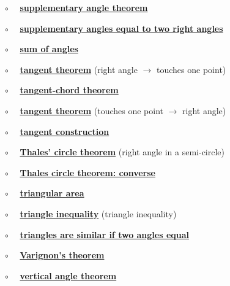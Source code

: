 \documentclass[11pt, oneside]{article}
\begin{document}
$\circ$ \ \ \hyperref[sec:supplementary_angle_theorem]{\textbf{supplementary angle theorem}}

$\circ$ \ \ \hyperref[sec:two_supplementary_equal_two_right]{\textbf{supplementary angles equal to two right angles}}

$\circ$ \ \  \hyperref[sec:triangle_sum_theorem]{\textbf{sum of angles}}

$\circ$ \ \ \hyperref[sec:tangent_one_point]{\textbf{tangent theorem}} (right angle $\rightarrow$ touches one point)

$\circ$ \ \ \hyperref[sec:tangent_chord_theorem]{\textbf{tangent-chord theorem}}

$\circ$ \ \ \hyperref[sec:tangent_perpendicular]{\textbf{tangent theorem}} (touches one point $\rightarrow$ right angle)

$\circ$ \ \ \hyperref[sec:tangent_construction]{\textbf{tangent construction}}

$\circ$ \ \ \hyperref[sec:Thales_theorem]{\textbf{Thales' circle theorem}} (right angle in a semi-circle)

$\circ$ \ \ \hyperref[sec:Thales_circle_theorem_converse]{\textbf{Thales circle theorem:  converse}}

$\circ$ \ \ \hyperref[sec:triangle_area]{\textbf{triangular area}}

$\circ$ \ \ \hyperref[sec:triangle_inequality]{\textbf{triangle inequality}} (triangle inequality)

$\circ$ \ \ \hyperref[sec:two_angles_similar]{\textbf{triangles are similar if two angles equal}}

$\circ$ \ \ \hyperref[sec:Varignon_theorem]{\textbf{Varignon's theorem}}

$\circ$ \ \ \hyperref[sec:vertical_angle_theorem]{\textbf{vertical angle theorem}}
\end{document}

